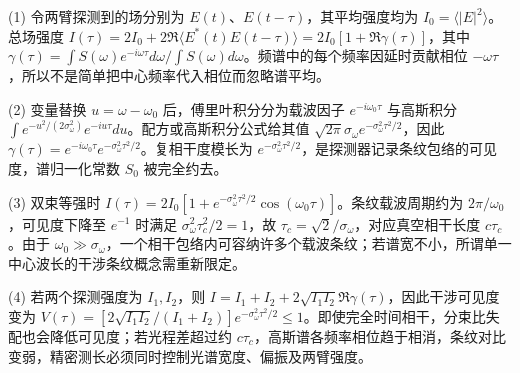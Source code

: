 (1) 令两臂探测到的场分别为 \(E(t)\)、\(E(t-\tau)\)，其平均强度均为 \(I_0=\langle|E|^2\rangle\)。总场强度 \(I(\tau)=2I_0+2\Re\langle E^*(t)E(t-\tau)\rangle=2I_0[1+\Re\gamma(\tau)]\)，其中 \(\gamma(\tau)=\int S(\omega)e^{-i\omega\tau}d\omega/\int S(\omega)d\omega\)。频谱中的每个频率因延时贡献相位 \(-\omega\tau\)，所以不是简单把中心频率代入相位而忽略谱平均。

(2) 变量替换 \(u=\omega-\omega_0\) 后，傅里叶积分分为载波因子 \(e^{-i\omega_0\tau}\) 与高斯积分 \(\int e^{-u^2/(2\sigma_\omega^2)}e^{-iu\tau}du\)。配方或高斯积分公式给其值 \(\sqrt{2\pi}\sigma_\omega e^{-\sigma_\omega^2\tau^2/2}\)，因此 \(\gamma(\tau)=e^{-i\omega_0\tau}e^{-\sigma_\omega^2\tau^2/2}\)。复相干度模长为 \(e^{-\sigma_\omega^2\tau^2/2}\)，是探测器记录条纹包络的可见度，谱归一化常数 \(S_0\) 被完全约去。

(3) 双束等强时 \(I(\tau)=2I_0[1+e^{-\sigma_\omega^2\tau^2/2}\cos(\omega_0\tau)]\)。条纹载波周期约为 \(2\pi/\omega_0\)，可见度下降至 \(e^{-1}\) 时满足 \(\sigma_\omega^2\tau_c^2/2=1\)，故 \(\tau_c=\sqrt2/\sigma_\omega\)，对应真空相干长度 \(c\tau_c\)。由于 \(\omega_0\gg\sigma_\omega\)，一个相干包络内可容纳许多个载波条纹；若谱宽不小，所谓单一中心波长的干涉条纹概念需重新限定。

(4) 若两个探测强度为 \(I_1,I_2\)，则 \(I=I_1+I_2+2\sqrt{I_1I_2}\Re\gamma(\tau)\)，因此干涉可见度变为 \(V(\tau)=[2\sqrt{I_1I_2}/(I_1+I_2)]e^{-\sigma_\omega^2\tau^2/2}\le1\)。即使完全时间相干，分束比失配也会降低可见度；若光程差超过约 \(c\tau_c\)，高斯谱各频率相位趋于相消，条纹对比变弱，精密测长必须同时控制光谱宽度、偏振及两臂强度。
